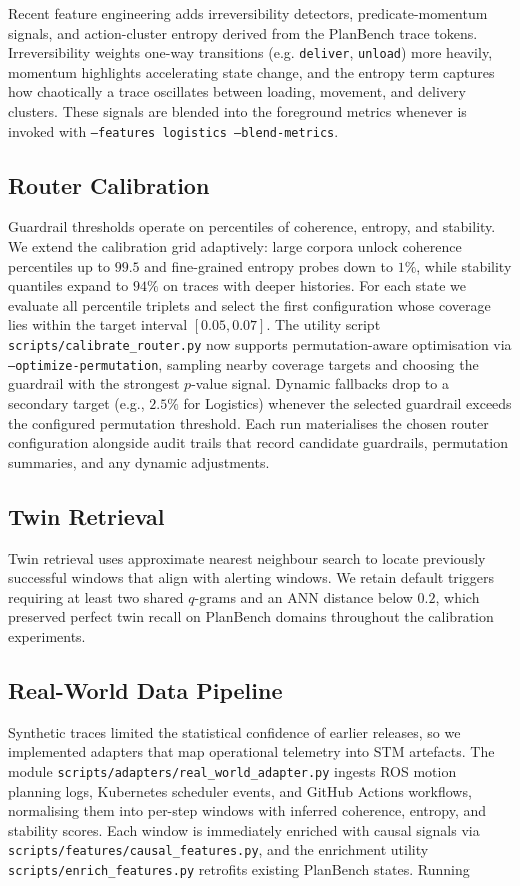 \documentclass[11pt]{article}
\begin{document}
Recent feature engineering adds irreversibility detectors, predicate-momentum
signals, and action-cluster entropy derived from the PlanBench trace tokens.
Irreversibility weights one-way transitions (e.g. \texttt{deliver},
\texttt{unload}) more heavily, momentum highlights accelerating state change,
and the entropy term captures how chaotically a trace oscillates between loading,
movement, and delivery clusters. These signals are blended into the foreground
metrics whenever  is invoked with
\texttt{--features logistics --blend-metrics}.

\subsection{Router Calibration}
\label{subsec:calibration}
Guardrail thresholds operate on percentiles of coherence, entropy, and stability.
We extend the calibration grid adaptively: large corpora unlock coherence
percentiles up to $99.5$ and fine-grained entropy probes down to $1\%$, while
stability quantiles expand to $94\%$ on traces with deeper histories. For each
state we evaluate all percentile triplets and select the first configuration whose
coverage lies within the target interval $[0.05, 0.07]$. The utility script
\texttt{scripts/calibrate\_router.py} now supports permutation-aware
optimisation via \texttt{--optimize-permutation}, sampling nearby coverage
targets and choosing the guardrail with the strongest $p$-value signal. Dynamic
fallbacks drop to a secondary target (e.g., $2.5\%$ for Logistics) whenever the
selected guardrail exceeds the configured permutation threshold. Each run
materialises the chosen router configuration alongside audit trails that record
candidate guardrails, permutation summaries, and any dynamic adjustments.

\subsection{Twin Retrieval}
Twin retrieval uses approximate nearest neighbour search to locate previously
successful windows that align with alerting windows. We retain default triggers
requiring at least two shared $q$-grams and an ANN distance below $0.2$, which
preserved perfect twin recall on PlanBench domains throughout the calibration
experiments.

\subsection{Real-World Data Pipeline}
\label{subsec:real-world-data-pipeline}
Synthetic traces limited the statistical confidence of earlier releases, so we
implemented adapters that map operational telemetry into STM artefacts. The
module \texttt{scripts/adapters/real\_world\_adapter.py} ingests ROS motion
planning logs, Kubernetes scheduler events, and GitHub Actions workflows,
normalising them into per-step windows with inferred coherence, entropy, and
stability scores. Each window is immediately enriched with causal signals via
\texttt{scripts/features/causal\_features.py}, and the enrichment utility
\texttt{scripts/enrich\_features.py} retrofits existing PlanBench states. Running
\end{document}

